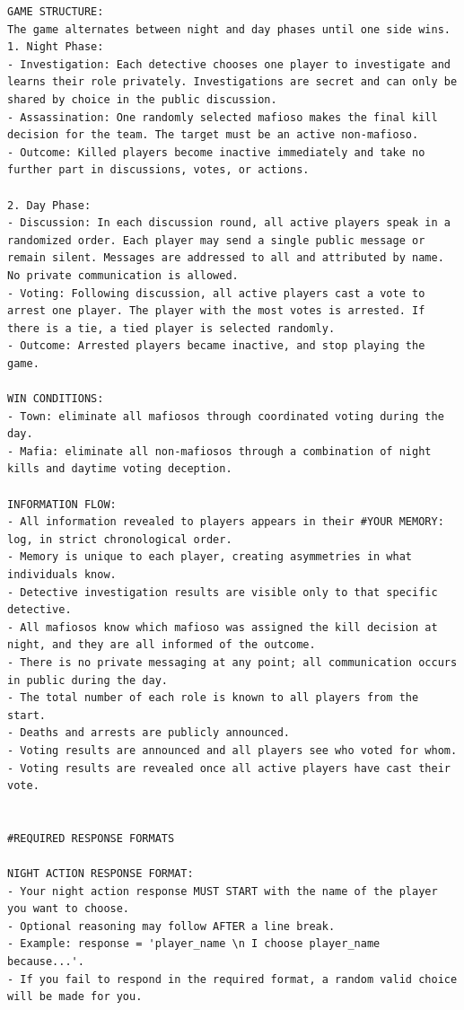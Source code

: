 \documentclass{article}
\begin{document}
\begin{small}
\begin{verbatim}
GAME STRUCTURE:
The game alternates between night and day phases until one side wins.
1. Night Phase:
- Investigation: Each detective chooses one player to investigate and learns their role privately. Investigations are secret and can only be shared by choice in the public discussion.
- Assassination: One randomly selected mafioso makes the final kill decision for the team. The target must be an active non-mafioso.
- Outcome: Killed players become inactive immediately and take no further part in discussions, votes, or actions.

2. Day Phase:
- Discussion: In each discussion round, all active players speak in a randomized order. Each player may send a single public message or remain silent. Messages are addressed to all and attributed by name. No private communication is allowed.
- Voting: Following discussion, all active players cast a vote to arrest one player. The player with the most votes is arrested. If there is a tie, a tied player is selected randomly.
- Outcome: Arrested players became inactive, and stop playing the game.

WIN CONDITIONS:
- Town: eliminate all mafiosos through coordinated voting during the day.
- Mafia: eliminate all non-mafiosos through a combination of night kills and daytime voting deception.

INFORMATION FLOW:
- All information revealed to players appears in their #YOUR MEMORY: log, in strict chronological order.
- Memory is unique to each player, creating asymmetries in what individuals know.
- Detective investigation results are visible only to that specific detective.
- All mafiosos know which mafioso was assigned the kill decision at night, and they are all informed of the outcome.
- There is no private messaging at any point; all communication occurs in public during the day.
- The total number of each role is known to all players from the start.
- Deaths and arrests are publicly announced.
- Voting results are announced and all players see who voted for whom.
- Voting results are revealed once all active players have cast their vote.


#REQUIRED RESPONSE FORMATS

NIGHT ACTION RESPONSE FORMAT:
- Your night action response MUST START with the name of the player you want to choose.
- Optional reasoning may follow AFTER a line break.
- Example: response = 'player_name \n I choose player_name because...'.
- If you fail to respond in the required format, a random valid choice will be made for you.


\end{verbatim}
\end{small}
\end{document}
